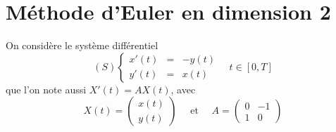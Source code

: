 \documentclass[a4paper]{article}
\begin{document}
\section{Méthode d'Euler en dimension 2}
 On considère le système différentiel
\[(S) \left\{\begin{array}{lll}
x'(t)&=&-y(t)\\
y'(t)&=&x(t)
\end{array}\right.\quad t\in [0,T]
\]
 que l'on note aussi $X'(t) = AX(t)$, avec
 \[X(t)= \left(\begin{array}{c} x(t)\\ y(t) \end{array} \right) \quad \mbox{ et }\quad
 A = \left(\begin{array}{cc} 0& -1 \\ 1&0 \end{array} \right)\]
\end{document}
